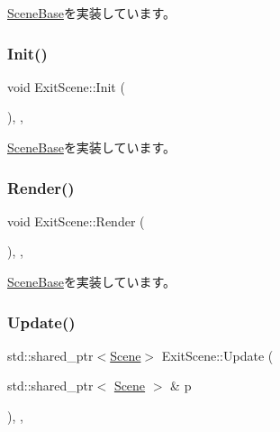 \mbox{\hyperlink{class_scene_base_a7c5b54020bc519b4dadfe9770d6b27f7}{Scene\+Base}}を実装しています。

\mbox{\label{class_exit_scene_a10f6018b0c4c639d0e8756885dbc834c}} 
\subsubsection{\texorpdfstring{Init()}{Init()}}
{\footnotesize\ttfamily void Exit\+Scene\+::\+Init (\begin{DoxyParamCaption}{ }\end{DoxyParamCaption})\hspace{0.3cm}{\ttfamily [inline]}, {\ttfamily [final]}, {\ttfamily [virtual]}}



\mbox{\hyperlink{class_scene_base_a24d7db43c819924dc8b07b436f6d3148}{Scene\+Base}}を実装しています。

\mbox{\label{class_exit_scene_aecf5de52db863695794ee0b0e68a4ad0}} 
\subsubsection{\texorpdfstring{Render()}{Render()}}
{\footnotesize\ttfamily void Exit\+Scene\+::\+Render (\begin{DoxyParamCaption}{ }\end{DoxyParamCaption})\hspace{0.3cm}{\ttfamily [inline]}, {\ttfamily [final]}, {\ttfamily [virtual]}}



\mbox{\hyperlink{class_scene_base_ad981674ce731ea267f398e889bbb9dc3}{Scene\+Base}}を実装しています。

\mbox{\label{class_exit_scene_a18655f3124150a911f266e66e3fc4480}} 
\subsubsection{\texorpdfstring{Update()}{Update()}}
{\footnotesize\ttfamily std\+::shared\+\_\+ptr$<$\mbox{\hyperlink{class_scene}{Scene}}$>$ Exit\+Scene\+::\+Update (\begin{DoxyParamCaption}\item[{std\+::shared\+\_\+ptr$<$ \mbox{\hyperlink{class_scene}{Scene}} $>$ \&}]{p }\end{DoxyParamCaption})\hspace{0.3cm}{\ttfamily [inline]}, {\ttfamily [final]}, {\ttfamily [virtual]}}




